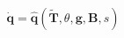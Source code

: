 \documentclass[preview]{standalone}
\begin{document}
\begin{align*}
\dot{\mathbf{q}} = \hat{\mathbf{q}}(\tilde{\mathbf{T}}, \theta, \mathbf{g}, \mathbf{B}, s)
\end{align*}
\end{document}
